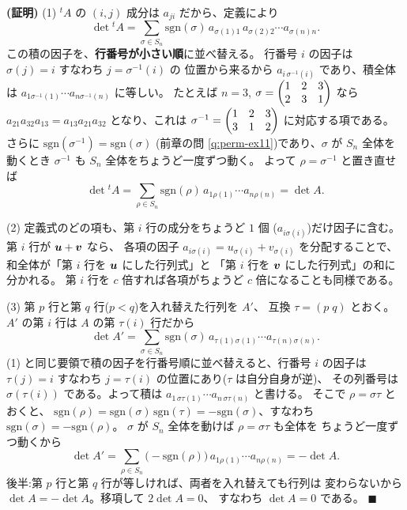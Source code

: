 \noindent\textbf{(証明)}\quad
(1) ${}^t\!A$ の $(i, j)$ 成分は $a_{ji}$ だから、定義により
\[
\det {}^t\!A = \sum_{\sigma \in S_n} \mathrm{sgn}(\sigma)\,
a_{\sigma(1)1}\, a_{\sigma(2)2} \cdots a_{\sigma(n)n}.
\]
この積の因子を、\textbf{行番号が小さい順}に並べ替える。
行番号 $i$ の因子は $\sigma(j) = i$ すなわち $j = \sigma^{-1}(i)$ の
位置から来るから $a_{i\,\sigma^{-1}(i)}$ であり、積全体は
$a_{1\sigma^{-1}(1)} \cdots a_{n\sigma^{-1}(n)}$ に等しい。
たとえば $n = 3$, $\sigma = \begin{pmatrix}1 & 2 & 3 \\ 2 & 3 & 1\end{pmatrix}$ なら
$a_{21}a_{32}a_{13} = a_{13}a_{21}a_{32}$ となり、これは
$\sigma^{-1} = \begin{pmatrix}1 & 2 & 3 \\ 3 & 1 & 2\end{pmatrix}$ に対応する項である。
さらに $\mathrm{sgn}(\sigma^{-1}) = \mathrm{sgn}(\sigma)$
(前章の問 \ref{q:perm-ex11})であり、$\sigma$ が $S_n$ 全体を動くとき
$\sigma^{-1}$ も $S_n$ 全体をちょうど一度ずつ動く。
よって $\rho = \sigma^{-1}$ と置き直せば
\[
\det {}^t\!A = \sum_{\rho \in S_n} \mathrm{sgn}(\rho)\,
a_{1\rho(1)} \cdots a_{n\rho(n)} = \det A.
\]

(2) 定義式のどの項も、第 $i$ 行の成分をちょうど $1$ 個
($a_{i\sigma(i)}$)だけ因子に含む。第 $i$ 行が $\bm{u} + \bm{v}$ なら、
各項の因子 $a_{i\sigma(i)} = u_{\sigma(i)} + v_{\sigma(i)}$ を分配することで、
和全体が「第 $i$ 行を $\bm{u}$ にした行列式」と
「第 $i$ 行を $\bm{v}$ にした行列式」の和に分かれる。
第 $i$ 行を $c$ 倍すれば各項がちょうど $c$ 倍になることも同様である。

(3) 第 $p$ 行と第 $q$ 行($p < q$)を入れ替えた行列を $A'$、
互換 $\tau = (p\;q)$ とおく。$A'$ の第 $i$ 行は $A$ の第 $\tau(i)$ 行だから
\[
\det A' = \sum_{\sigma \in S_n} \mathrm{sgn}(\sigma)\,
a_{\tau(1)\sigma(1)} \cdots a_{\tau(n)\sigma(n)}.
\]
(1) と同じ要領で積の因子を行番号順に並べ替えると、行番号 $i$ の因子は
$\tau(j) = i$ すなわち $j = \tau(i)$ の位置にあり($\tau$ は自分自身が逆)、
その列番号は $\sigma(\tau(i))$ である。よって積は
$a_{1\,\sigma\tau(1)} \cdots a_{n\,\sigma\tau(n)}$ と書ける。
そこで $\rho = \sigma\tau$ とおくと、
$\mathrm{sgn}(\rho) = \mathrm{sgn}(\sigma)\,\mathrm{sgn}(\tau)
= -\mathrm{sgn}(\sigma)$、すなわち $\mathrm{sgn}(\sigma) = -\mathrm{sgn}(\rho)$。
$\sigma$ が $S_n$ 全体を動けば $\rho = \sigma\tau$ も全体を
ちょうど一度ずつ動くから
\[
\det A' = \sum_{\rho \in S_n} \bigl(-\mathrm{sgn}(\rho)\bigr)\,
a_{1\rho(1)} \cdots a_{n\rho(n)} = -\det A.
\]
後半:第 $p$ 行と第 $q$ 行が等しければ、両者を入れ替えても行列は
変わらないから $\det A = -\det A$。移項して $2\det A = 0$、
すなわち $\det A = 0$ である。 $\blacksquare$

